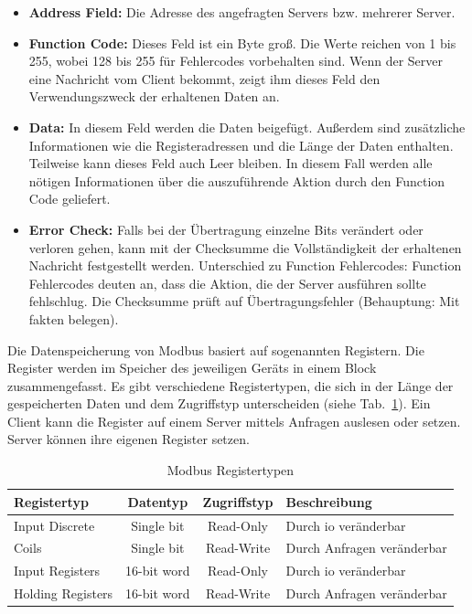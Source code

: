 \begin{itemize}
	\item \textbf{Address Field:} Die Adresse des angefragten Servers bzw. mehrerer Server.
	\item \textbf{Function Code:} Dieses Feld ist ein Byte groß. Die Werte reichen von 1 bis 255, wobei 128 bis 255 für Fehlercodes vorbehalten sind. Wenn der Server eine Nachricht vom Client bekommt, zeigt ihm dieses Feld den Verwendungszweck der erhaltenen Daten an. 
	\item \textbf{Data:} In diesem Feld werden die Daten beigefügt. Außerdem sind zusätzliche Informationen wie die Registeradressen und die Länge der Daten enthalten. Teilweise kann dieses Feld auch Leer bleiben. In diesem Fall werden alle nötigen Informationen über die auszuführende Aktion durch den Function Code geliefert.
	\item \textbf{Error Check:} Falls bei der Übertragung einzelne Bits verändert oder verloren gehen, kann mit der Checksumme die Vollständigkeit der erhaltenen Nachricht festgestellt werden.
	Unterschied zu Function Fehlercodes: Function Fehlercodes deuten an, dass die Aktion, die der Server ausführen sollte fehlschlug. Die Checksumme prüft auf Übertragungsfehler (Behauptung: Mit fakten belegen).
\end{itemize}

Die Datenspeicherung von Modbus basiert auf sogenannten Registern. Die Register werden im Speicher des jeweiligen Geräts in einem Block zusammengefasst. Es gibt verschiedene Registertypen, die sich in der Länge der gespeicherten Daten und dem Zugriffstyp unterscheiden (siehe Tab.~\ref{tab:modbus_register}). \newline Ein Client kann die Register auf einem Server mittels Anfragen auslesen oder setzen. Server können ihre eigenen Register setzen.
\begin{table}[H]
	\caption{Modbus Registertypen \label{tab:modbus_register}}
	\begin{tabularx}{\textwidth}{@{}l|c|c|X@{}}
		\toprule
		\textbf{Registertyp} & \textbf{Datentyp} & \textbf{Zugriffstyp} & \textbf{Beschreibung} \\
		\midrule
		Input Discrete & Single bit & Read-Only & Durch \acf{io} veränderbar \\
		Coils & Single bit & Read-Write & Durch Anfragen veränderbar \\
		Input Registers & 16-bit word & Read-Only & Durch \acs{io} veränderbar \\
		Holding Registers & 16-bit word & Read-Write & Durch Anfragen veränderbar \\
		\bottomrule
	\end{tabularx}
\end{table} 
\cite{IPC2U_GmbH:o.J.}

